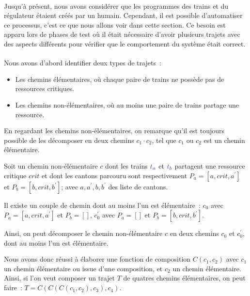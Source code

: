 \documentclass[oneside, a4paper, 11pt]{book}
\newcommand{\trainFmt}[1]{{\color{traincolor} #1}}
\newcommand{\tid}[1]{\ensuremath{\trainFmt{t_{#1}}}}
\begin{document}
\paragraph{} Jusqu'à présent, nous avons considérer que les programmes des trains et du régulateur étaient créés par un humain. Cependant, il est possible d'automatiser ce processus, c'est ce que nous allons voir dans cette section.
Ce besoin est apparu lors de phases de test où il était nécessaire d'avoir plusieurs trajets avec des aspects différents pour vérifier que le comportement du système était correct.

\paragraph{}Nous avons d'abord identifier deux types de trajets~:
\begin{itemize}
	\item Les chemins élémentaires, où chaque paire de trains ne possède pas de ressources critiques.
	\item Les chemins non-élémentaires, où au moins une paire de trains partage une ressource.
\end{itemize}
En regardant les chemins non-élémentaires, on remarque qu'il est toujours possible de les décomposer en deux chemins $c_1 \cdot c_2$, tel que $c_1$ ou $c_2$ est un chemin élémentaire.

\begin{example}
	Soit un chemin non-élémentaire $c$ dont les trains \tid{a} et \tid{b} partagent une ressource critique $crit$ et dont les cantons parcouru sont respectivement $P_a = [a,crit,a^\prime]$ et $ P_b = [b,crit,b^\prime]$; avec $a,a^\prime,b,b^\prime$ des liste de cantons.

	Il existe un couple de chemin dont au moins l'un est élémentaire~: $c_0$ avec $P_a = [a,crit,a^\prime]$ et $P_b = []$, $c_0^\prime$ avec $P_a = []$ et $P_b = [b,crit,b^\prime]$.

	Ainsi, on peut décomposer le chemin non-élémentaire $c$ en deux chemins $c_0$ et $c_0^\prime$, dont au moins l'un est élémentaire.
\end{example}

Nous avons donc réussi à élaborer une fonction de composition $C(c_1,c_2)$ avec $c_1$ un chemin élémentaire ou issue d'une composition, et $c_2$ un chemin élémentaire. Ainsi, si l'on veut composer un trajet $T$ de quatres chemins élémentaires, on peut faire~: $T=C(C(C(c_1,c_2),c_3),c_4)$.
\end{document}
